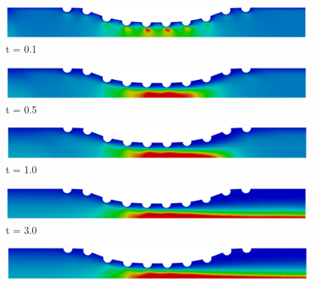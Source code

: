 \vspace{2cm} 
\begin{figure}[H]
     \begin{minipage}{.50\linewidth}
      \centering
      \includegraphics[scale=0.12]{./02_chaps/cap_solution/figure/vel_CurvedStrut200.png}\\
      t = 0.1
     \end{minipage}%
     \begin{minipage}{.50\linewidth}
      \centering
      \includegraphics[scale=0.12]{./02_chaps/cap_solution/figure/vel_CurvedStrut1000.png}\\
      t = 0.5
     \end{minipage}
     \begin{minipage}{.50\linewidth}
     \medskip
      \centering
      \includegraphics[scale=0.12]{./02_chaps/cap_solution/figure/vel_CurvedStrut2000.png}\\
      t = 1.0
     \end{minipage}%
     \begin{minipage}{.50\linewidth}
     \medskip
      \centering
      \includegraphics[scale=0.12]{./02_chaps/cap_solution/figure/vel_CurvedStrut6000.png}\\
      t = 3.0
     \end{minipage}
     \begin{minipage}{.50\linewidth}
      \centering
      \includegraphics[scale=0.12]{./02_chaps/cap_solution/figure/vel_CurvedStrut8000.png}\\

\end{minipage}
\end{figure}
